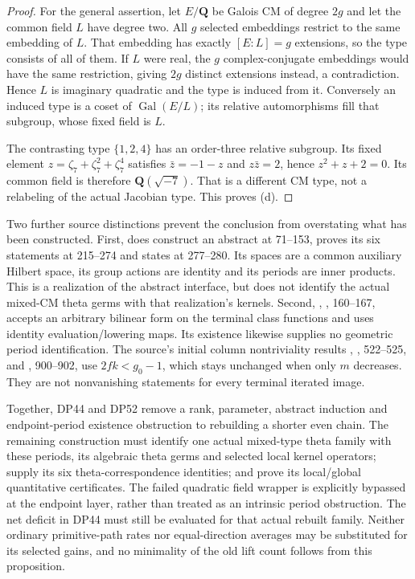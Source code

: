 \begin{proof}
For the general assertion, let $E/\mathbf Q$ be Galois CM of degree $2g$
and let the common field $L$ have degree two.
All $g$ selected embeddings restrict to the same embedding of $L$.
That embedding has exactly $[E:L]=g$ extensions, so the type consists
of all of them.
If $L$ were real, the $g$ complex-conjugate embeddings would have the same
restriction, giving $2g$ distinct extensions instead, a contradiction.
Hence $L$ is imaginary quadratic and the type is induced from it.
Conversely an induced type is a coset of $\operatorname{Gal}(E/L)$;
its relative automorphisms fill that subgroup, whose fixed field is $L$.

The contrasting type $\{1,2,4\}$ has an order-three relative subgroup.
Its fixed element $z=\zeta_7+\zeta_7^2+\zeta_7^4$ satisfies
$\bar z=-1-z$ and $z\bar z=2$, hence $z^2+z+2=0$.
Its common field is therefore $\mathbf Q(\sqrt{-7})$.
That is a different CM type, not a relabeling of the actual Jacobian type.
This proves (d).
\end{proof}

Two further source distinctions prevent the conclusion from overstating
what has been constructed.
First, 
does construct an abstract  at 71--153, proves its six
statements at 215--274 and states  at 277--280.
Its spaces are a common auxiliary Hilbert space, its group actions are
identity and its periods are inner products.
This is a realization of the abstract interface, but does not identify
the actual mixed-CM theta germs with that realization's kernels.
Second, , , 160--167,
accepts an arbitrary bilinear form on the terminal class functions and
uses identity evaluation/lowering maps.
Its existence likewise supplies no geometric period identification.
The source's initial column nontriviality results
, , 522--525, and
, 900--902, use $2fk<g_0-1$,
which stays unchanged when only $m$ decreases.
They are not nonvanishing statements for every terminal iterated image.

Together, DP44 and DP52 remove a rank, parameter, abstract induction and
endpoint-period existence obstruction to rebuilding a shorter even chain.
The remaining construction must identify one actual mixed-type theta
family with these periods, its algebraic theta germs and selected local
kernel operators; supply its six theta-correspondence identities; and
prove its local/global quantitative certificates.
The failed quadratic field wrapper is explicitly bypassed at the
endpoint layer, rather than treated as an intrinsic period obstruction.
The net deficit in DP44 must still be evaluated for that actual rebuilt
family. Neither ordinary primitive-path rates nor equal-direction averages
may be substituted for its selected gains, and no minimality of the old
lift count follows from this proposition.
